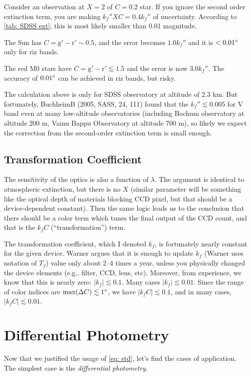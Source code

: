 \begin{ex}
Consider an observation at $ X = 2 $ of $ C = 0.2 $ star. If you ignore the second order extinction term, you are making $ k_f'' XC = 0.4 k_f'' $ of uncertainty. According to \cref{tab: SDSS ext}, this is most likely smaller than 0.01 magnitude. 

The Sun has $ C = \mathrm{g' - r'} \sim 0.5 $, and the error becomes $ 1.0 k_f'' $ and it is $ < \m{0.01} $ only for riz bands.

The red M0 stars have $ C = \mathrm{g' - r'} \lesssim 1.5 $ and the error is now $ 3.0 k_f'' $. The accuracy of $ \m{0.01} $ can be achieved in riz bands, but risky.
\end{ex}

The calculation above is only for SDSS observatory at altitude of 2.3 km. But fortunately, BuchheimB (2005, SASS, 24, 111) found that the $ k_f'' \lesssim 0.005 $ for V band even at many low-altitude observatories (including Bochum observatory at altitude 200 m, Vainu Bappu Observatory at altitude 700 m), so likely we expect the correction from the second-order extinction term is small enough.


\subsection{Transformation Coefficient}
The sensitivity of the optics is also a function of $ \lambda $. The argument is identical to atmospheric extinction, but there is no $ X $ (similar parameter will be something like the optical depth of materials blocking CCD pixel, but that should be a device-dependent constant). Then the same logic leads us to the conclusion that there should be a color term which tunes the final output of the CCD count, and that is the $ k_f C $ (``transformation'') term.

The transformation coefficient, which I denoted $ k_f $, is fortunately nearly constant for the given device. Warner argues that it is enough to update $ k_f $ (Warner uses notation of $ T_f $) value only about 2--4 times a year, unless you physically changed the device elements (e.g., filter, CCD, lens, etc). Moreover, from experience, we know that this is nearly zero: $ |k_f| \lesssim 0.1 $. Many cases $ |k_f| \lesssim 0.01 $. Since the range of color indices are $ \mathrm{max}(\Delta C) \lesssim \m{1} $, we have $ |k_f C| \lesssim 0.1 $, and in many cases, $ |k_f C| \lesssim 0.01 $.


\section{Differential Photometry}
Now that we justified the usage of \cref{eq: std}, let's find the cases of application. The simplest case is the \textit{differential photometry}. 

